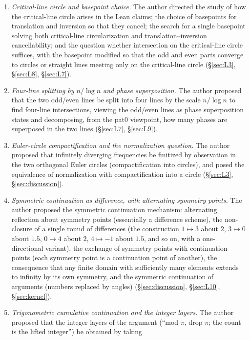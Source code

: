 \documentclass{article}
\begin{document}
\begin{enumerate}
\item \emph{Critical-line circle and basepoint choice.} The author directed
the study of how the critical-line circle arises in the Lean claims; the
choice of basepoints for translation and inversion so that they cancel; the
search for a single basepoint solving both critical-line circularization and
translation--inversion cancellability; and the question whether intersection
on the critical-line circle suffices, with the basepoint modified so that
the odd and even parts converge to circles or straight lines meeting only on
the critical-line circle (\S\ref{sec:L3}, \S\ref{sec:L8},
\S\ref{sec:L7}).
\item \emph{Four-line splitting by $n/\log n$ and phase superposition.} The
author proposed that the two odd/even lines be split into four lines by the
scale $n/\log n$ to find four-line intersections, viewing the odd/even lines
as phase superposition states and decomposing, from the pat0 viewpoint, how
many phases are superposed in the two lines (\S\ref{sec:L7},
\S\ref{sec:L9}).
\item \emph{Euler-circle compactification and the normalization question.}
The author proposed that infinitely diverging frequencies be finitized by
observation in the two orthogonal Euler circles (compactification into
circles), and posed the equivalence of normalization with compactification
into a circle (\S\ref{sec:L3}, \S\ref{sec:discussion}).
\item \emph{Symmetric continuation as difference, with alternating symmetry
points.} The author proposed the symmetric continuation mechanism:
alternating reflection about symmetry points (essentially a difference
scheme), the non-closure of a single round of differences (the construction
$1\mapsto3$ about $2$, $3\mapsto0$ about $1.5$, $0\mapsto4$ about $2$,
$4\mapsto-1$ about $1.5$, and so on, with a one-directional variant), the
exchange of symmetry points with continuation points (each symmetry point is
a continuation point of another), the consequence that any finite domain
with sufficiently many elements extends to infinity by its own symmetry, and
the symmetric continuation of arguments (numbers replaced by angles)
(\S\ref{sec:discussion}, \S\ref{sec:L10}, \S\ref{sec:kernel}).
\item \emph{Trigonometric cumulative continuation and the integer layers.}
The author proposed that the integer layers of the argument (``mod $\pi$,
drop $\pi$; the count is the lifted integer'') be obtained by taking

\end{enumerate}
\end{document}
